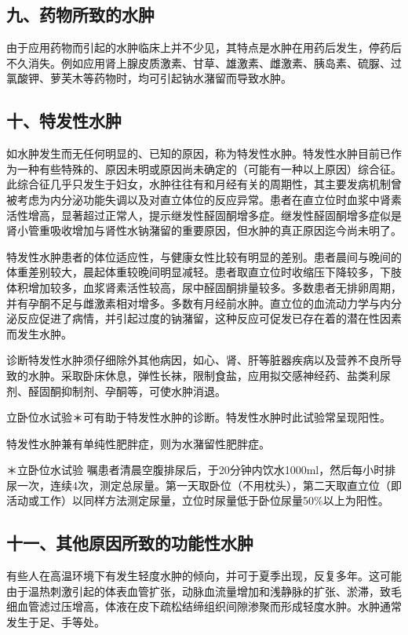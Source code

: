 \subsection{九、药物所致的水肿}

由于应用药物而引起的水肿临床上并不少见，其特点是水肿在用药后发生，停药后不久消失。例如应用肾上腺皮质激素、甘草、雄激素、雌激素、胰岛素、硫脲、过氯酸钾、萝芙木等药物时，均可引起钠水潴留而导致水肿。

\subsection{十、特发性水肿}

如水肿发生而无任何明显的、已知的原因，称为特发性水肿。特发性水肿目前已作为一种有些特殊的、原因未明或原因尚未确定的（可能有一种以上原因）综合征。此综合征几乎只发生于妇女，水肿往往有和月经有关的周期性，其主要发病机制曾被考虑为内分泌功能失调以及对直立体位的反应异常。患者在直立位时血浆中肾素活性增高，显著超过正常人，提示继发性醛固酮增多症。继发性醛固酮增多症似是肾小管重吸收增加与肾性水钠潴留的重要原因，但水肿的真正原因迄今尚未明了。

特发性水肿患者的体位适应性，与健康女性比较有明显的差别。患者晨间与晚间的体重差别较大，晨起体重较晚间明显减轻。患者取直立位时收缩压下降较多，下肢体积增加较多，血浆肾素活性较高，尿中醛固酮排量较多。多数患者无排卵周期，并有孕酮不足与雌激素相对增多。多数有月经前水肿。直立位的血流动力学与内分泌反应促进了病情，并引起过度的钠潴留，这种反应可促发已存在着的潜在性因素而发生水肿。

诊断特发性水肿须仔细除外其他病因，如心、肾、肝等脏器疾病以及营养不良所导致的水肿。采取卧床休息，弹性长袜，限制食盐，应用拟交感神经药、盐类利尿剂、醛固酮抑制剂、孕酮等，可使水肿消退。

立卧位水试验＊可有助于特发性水肿的诊断。特发性水肿时此试验常呈现阳性。

特发性水肿兼有单纯性肥胖症，则为水潴留性肥胖症。

＊立卧位水试验
嘱患者清晨空腹排尿后，于20分钟内饮水1000ml，然后每小时排尿一次，连续4次，测定总尿量。第一天取卧位（不用枕头），第二天取直立位（即活动或工作）以同样方法测定尿量，立位时尿量低于卧位尿量50\%以上为阳性。

\subsection{十一、其他原因所致的功能性水肿}

有些人在高温环境下有发生轻度水肿的倾向，并可于夏季出现，反复多年。这可能由于温热刺激引起的体表血管扩张，动脉血流量增加和浅静脉的扩张、淤滞，致毛细血管滤过压增高，体液在皮下疏松结缔组织间隙渗聚而形成轻度水肿。水肿通常发生于足、手等处。

